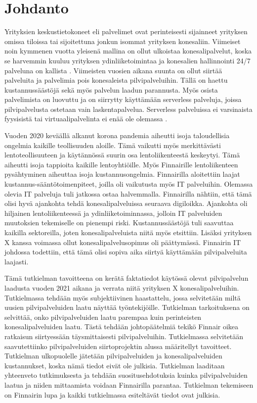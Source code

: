\chapter{Johdanto\label{johdanto}}
Yrityksien keskustietokoneet eli palvelimet ovat perinteisesti sijainneet yrityksen omissa tiloissa tai sijoitettuna jonkun isommat yrityksen konesaliin. Viimeiset noin kymmenen vuotta yleisenä mallina on ollut ulkoistaa konesalipalvelut, koska se harvemmin kuuluu yrityksen ydinliiketoimintaa ja konesalien hallinnointi 24/7 palveluna on kallista \citep{data_center_outsourcing}. Viimeisten vuosien aikana suunta on ollut siirtää palveluita ja palvelimia pois konesaleista pilvipalveluihin. Tällä on haettu kustannussäästöjä sekä myös palvelun laadun parannusta. Myös osista palvelimista on luovuttu ja on siirrytty käyttämään serverless palveluja, joissa pilvipalvelusta ostetaan vain laskentapalvelua. Serverless palveluissa ei varsinaista fyysisistä tai virtuaalipalvelinta ei enää ole olemassa \citep{serverless_computing}.




Vuoden 2020 keväällä alkanut korona pandemia aiheutti isoja taloudellisia ongelmia kaikille teollisuuden aloille. Tämä vaikutti myös merkittävästi lentoteollisuuteen ja käytännössä suurin osa lentoliikenteestä keskeytyi. Tämä aiheutti isoja tappioita kaikille lentoyhtiöille. Myös Finnairille lentoliikenteen pysähtyminen aiheuttaa isoja kustannusongelmia. Finnairilla aloitettiin laajat kustannus-sääntötoimenpiteet, joilla oli vaikutusta myös IT palveluihin. Olemassa olevia IT palveluja tuli jatkossa ostaa halvemmalla. Finnairilla nähtiin, että tämä olisi hyvä ajankohta tehdä konesalipalveluissa seuraava digiloikka. Ajankohta oli hiljainen lentoliikenteessä ja ydinliiketoiminnassa, jolloin IT palveluiden muutoksien tekemiselle on pienempi riski. Kustannussäästöjä tuli saavuttaa kaikilla sektoreilla, joten konesalipalveluista niitä myös etsittiin. Lisäksi yrityksen X kanssa voimassa ollut konesalipalvelusopimus oli päättymässä. Finnairin IT johdossa todettiin, että tämä olisi sopiva aika siirtyä käyttämään pilvipalveluita laajasti. \citep{finnair_use_ibm}

Tämä tutkielman tavoitteena on kerätä faktatiedot käytössä olevat pilvipalvelun laadusta vuoden 2021 aikana ja verrata niitä yrityksen X konesalipalveluihin. Tutkielmassa tehdään myös subjektiivinen haastattelu, jossa selvitetään miltä uusien pilvipalveluiden laatu näyttää työntekijöille. Tutkielman tarkoituksena on selvittää, onko pilvipalveluiden laatu parempaa kuin perinteisten konesalipalveluiden laatu. Tästä tehdään johtopäätelmiä tekikö Finnair oikea ratkaisun siirtyessään täysmittaisesti pilvipalveluihin. Tutkielmassa selvitetään saavutettiinko pilvipalveluiden siirtoprojektin alussa määritellyt tavoitteet. Tutkielman ulkopuolelle jätetään pilvipalveluiden ja konesalipalveluiden kustannukset, koska nämä tiedot eivät ole julkisia. Tutkielman laaditaan yhteenveto tutkimuksesta ja tehdään suositusehdotuksia kuinka pilvipalveluiden laatua ja niiden mittaamista voidaan Finnairilla parantaa. Tutkielman tekemiseen on Finnairin lupa ja kaikki tutkielmassa esiteltävät tiedot ovat julkisia.


